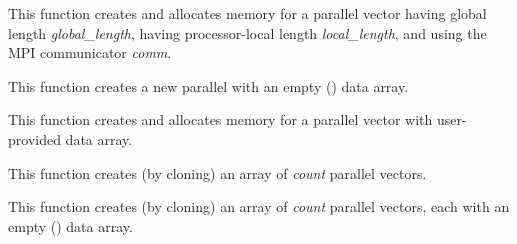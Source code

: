 \documentclass[letterpaper,10pt,english]{sphinxmanual}
\begin{document}
\begin{fulllineitems}
\label{nvectors/NVector_Parallel:N_VNew_Parallel}
This function creates and allocates memory for a parallel vector
having global length \emph{global\_length}, having processor-local length
\emph{local\_length}, and using the MPI communicator \emph{comm}.

\end{fulllineitems}


\begin{fulllineitems}
\label{nvectors/NVector_Parallel:N_VNewEmpty_Parallel}
This function creates a new parallel  with an empty
() data array.

\end{fulllineitems}


\begin{fulllineitems}
\label{nvectors/NVector_Parallel:N_VMake_Parallel}
This function creates and allocates memory for a parallel vector
with user-provided data array.

\end{fulllineitems}


\begin{fulllineitems}
\label{nvectors/NVector_Parallel:N_VCloneVectorArray_Parallel}
This function creates (by cloning) an array of \emph{count} parallel vectors.

\end{fulllineitems}


\begin{fulllineitems}
\label{nvectors/NVector_Parallel:N_VCloneEmptyVectorArray_Parallel}
This function creates (by cloning) an array of \emph{count} parallel
vectors, each with an empty () data array.

\end{fulllineitems}
\end{document}
